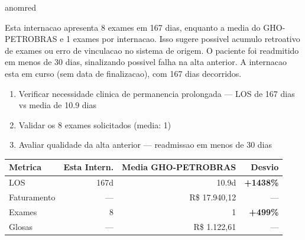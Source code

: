 \documentclass[a4paper,10pt]{article}
\begin{document}
\begin{anomalycard}[Internacao 150288 | GHO-PETROBRAS | CRITICO (z=6.45)]{anomred}
\vspace{2pt}\begin{tcolorbox}[colback=severityred!20,colframe=anomred,title={\textbf{Interpretacao de Negocio}},fonttitle=\bfseries\small,left=4pt,right=4pt,top=3pt,bottom=3pt]
{\small Esta internacao apresenta 8 exames em 167 dias, enquanto a media do GHO-PETROBRAS e 1 exames por internacao. Isso sugere possivel acumulo retroativo de exames ou erro de vinculacao no sistema de origem. O paciente foi readmitido em menos de 30 dias, sinalizando possivel falha na alta anterior. A internacao esta em curso (sem data de finalizacao), com 167 dias decorridos.}
\end{tcolorbox}
\begin{tcolorbox}[colback=severityyellow!30,colframe=anomorange,title={\textbf{Recomendacoes Especificas}},fonttitle=\bfseries\small,left=4pt,right=4pt,top=3pt,bottom=3pt]
\begin{enumerate}[nosep,leftmargin=16pt]
\item {\small Verificar necessidade clinica de permanencia prolongada --- LOS de 167 dias vs media de 10.9 dias}
\item {\small Validar os 8 exames solicitados (media: 1)}
\item {\small Avaliar qualidade da alta anterior --- readmissao em menos de 30 dias}
\end{enumerate}
\end{tcolorbox}
\begin{center}\begin{tabular}{l r r r}\toprule\textbf{Metrica} & \textbf{Esta Intern.} & \textbf{Media GHO-PETROBRAS} & \textbf{Desvio} \\\midrule
LOS & 167d & 10.9d & \textcolor{anomred}{\textbf{+1438\%}} \\
Faturamento & --- & R\$ 17.940,12 & --- \\
Exames & 8 & 1 & \textcolor{anomred}{\textbf{+499\%}} \\
Glosas & --- & R\$ 1.122,61 & --- \\
\bottomrule\end{tabular}\end{center}


\end{anomalycard}
\end{document}
